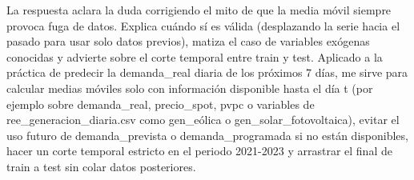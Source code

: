 \documentclass[12pt,a4paper,oneside]{book}
\begin{document}
\begin{iaanalisis}
La respuesta aclara la duda corrigiendo el mito de que la media móvil siempre provoca fuga de datos. Explica cuándo sí es válida (desplazando la serie hacia el pasado para usar solo datos previos), matiza el caso de variables exógenas conocidas y advierte sobre el corte temporal entre train y test. Aplicado a la práctica de predecir la demanda\_real diaria de los próximos 7 días, me sirve para calcular medias móviles solo con información disponible hasta el día t (por ejemplo sobre demanda\_real, precio\_spot, pvpc o variables de ree\_generacion\_diaria.csv como gen\_eólica o gen\_solar\_fotovoltaica), evitar el uso futuro de demanda\_prevista o demanda\_programada si no están disponibles, hacer un corte temporal estricto en el periodo 2021-2023 y arrastrar el final de train a test sin colar datos posteriores.
\end{iaanalisis}
\end{document}

